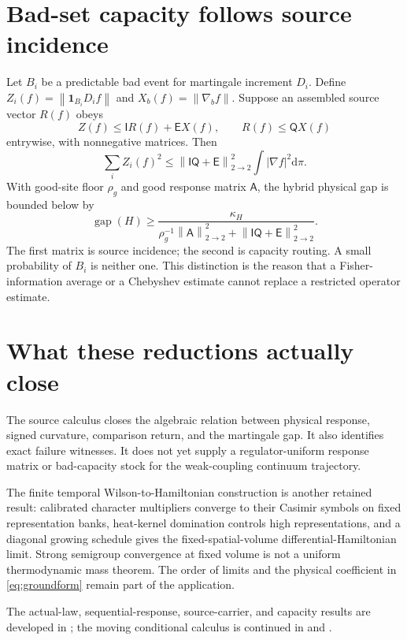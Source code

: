 \documentclass[11pt,oneside,openany]{book}
\theoremstyle{definition}
\theoremstyle{remark}
\newcommand{\one}{\mathbf1}
\newcommand{\dd}{\mathrm d}
\newcommand{\gap}{\operatorname{gap}}
\newcommand{\norm}[1]{\left\lVert#1\right\rVert}
\newcommand{\src}[2]{\cite[#2]{#1}}
\newcommand{\sourcebasis}[1]{\par\smallskip\noindent #1\par}
\begin{document}
\section{Bad-set capacity follows source incidence}
Let $B_i$ be a predictable bad event for martingale increment $D_i$. Define $Z_i(f)=\norm{\one_{B_i}D_if}$ and $X_b(f)=\norm{\nabla_bf}$. Suppose an assembled source vector $R(f)$ obeys
\[
Z(f)\le\mathsf I R(f)+\mathsf E X(f),\qquad R(f)\le\mathsf QX(f)
\]
entrywise, with nonnegative matrices. Then
\begin{equation}\label{eq:bad-capacity}
\sum_i Z_i(f)^2\le
\norm{\mathsf I\mathsf Q+\mathsf E}_{2\to2}^2\int|\nabla f|^2\dd\pi.
\end{equation}
With good-site floor $\rho_g$ and good response matrix $\mathsf A$, the hybrid physical gap is bounded below by
\begin{equation}\label{eq:hybrid-gap}
\gap(H)\ge
\frac{\kappa_H}{\rho_g^{-1}\norm{\mathsf A}_{2\to2}^2+
\norm{\mathsf I\mathsf Q+\mathsf E}_{2\to2}^2}.
\end{equation}
The first matrix is source incidence; the second is capacity routing. A small probability of $B_i$ is neither one. This distinction is the reason that a Fisher-information average or a Chebyshev estimate cannot replace a restricted operator estimate. \src{F1}{V19--V20}

\section{What these reductions actually close}
The source calculus closes the algebraic relation between physical response, signed curvature, comparison return, and the martingale gap. It also identifies exact failure witnesses. It does not yet supply a regulator-uniform response matrix or bad-capacity stock for the weak-coupling continuum trajectory.

The finite temporal Wilson-to-Hamiltonian construction is another retained result: calibrated character multipliers converge to their Casimir symbols on fixed representation banks, heat-kernel domination controls high representations, and a diagonal growing schedule gives the fixed-spatial-volume differential-Hamiltonian limit. Strong semigroup convergence at fixed volume is not a uniform thermodynamic mass theorem. The order of limits and the physical coefficient in \cref{eq:groundform} remain part of the application. \src{F1}{V10--V11}
\sourcebasis{The actual-law, sequential-response, source-carrier, and capacity results are developed in \src{F1}{V6--V22}; the moving conditional calculus is continued in \src{F6}{terminal developments} and \src{F7}{opening conditional analysis}.}
\end{document}
